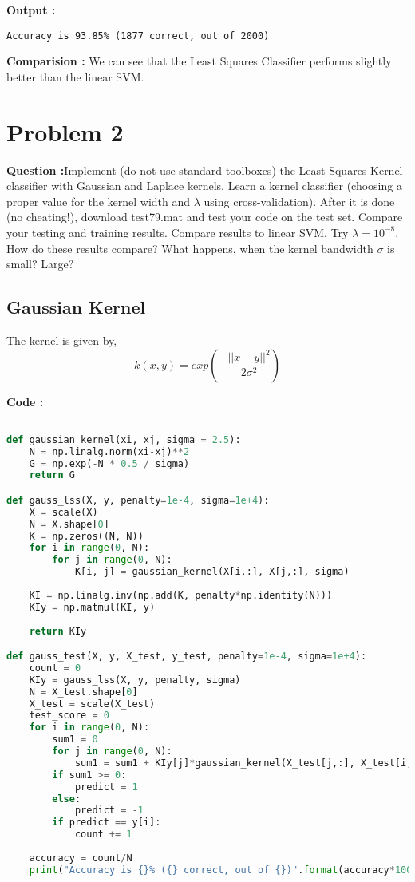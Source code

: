 \documentclass[a4paper, 11pt]{article}
\begin{document}
\textbf{Output :}
\begin{verbatim}
Accuracy is 93.85% (1877 correct, out of 2000)
\end{verbatim}

\textbf{Comparision :} We can see that the Least Squares Classifier performs slightly better than the linear SVM.

\clearpage

\section*{Problem 2}
\textbf{Question :}Implement (do not use standard toolboxes) the Least Squares Kernel classifier with Gaussian and Laplace kernels.  Learn a kernel classifier (choosing a proper value for the kernel width and $\lambda$ using cross-validation).  After it is done (no cheating!), download test79.mat and test your code on the test set.  Compare your testing and training results.  Compare results to linear SVM. Try $\lambda= 10^{-8}$.  How do these results compare?  What happens, when the kernel bandwidth $\sigma$ is small?  Large?

\subsection*{Gaussian Kernel}

The kernel is given by,
$$ k(x,y) = exp(-\frac{||x-y||^2}{2\sigma^2})$$

\textbf{Code :}
\begin{lstlisting}[language=Python]

def gaussian_kernel(xi, xj, sigma = 2.5):
    N = np.linalg.norm(xi-xj)**2
    G = np.exp(-N * 0.5 / sigma)
    return G

def gauss_lss(X, y, penalty=1e-4, sigma=1e+4):
    X = scale(X)
    N = X.shape[0]
    K = np.zeros((N, N))
    for i in range(0, N):
        for j in range(0, N):
            K[i, j] = gaussian_kernel(X[i,:], X[j,:], sigma)
    
    KI = np.linalg.inv(np.add(K, penalty*np.identity(N)))
    KIy = np.matmul(KI, y)
    
    return KIy

def gauss_test(X, y, X_test, y_test, penalty=1e-4, sigma=1e+4):
    count = 0
    KIy = gauss_lss(X, y, penalty, sigma)
    N = X_test.shape[0]
    X_test = scale(X_test)
    test_score = 0
    for i in range(0, N):
        sum1 = 0
        for j in range(0, N):
            sum1 = sum1 + KIy[j]*gaussian_kernel(X_test[j,:], X_test[i, :], sigma)
        if sum1 >= 0:
            predict = 1
        else:
            predict = -1
        if predict == y[i]:
            count += 1
    
    accuracy = count/N
    print("Accuracy is {}% ({} correct, out of {})".format(accuracy*100.0, count, N))

\end{lstlisting}
\end{document}
